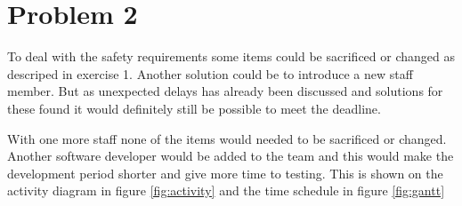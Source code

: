 \chapter{Problem 2}
\label{chp:two}


To deal with the safety requirements some items could be sacrificed or changed as descriped in exercise 1. Another solution could be to introduce a new staff member. But as unexpected delays has already been discussed and solutions for these found it would definitely still be possible to meet the deadline.

With one more staff none of the items would needed to be sacrificed or changed. Another software developer would be added to the team and this would make the development period shorter and give more time to testing. This is shown on the activity diagram in figure \ref{fig:activity} and the time schedule in figure \ref{fig:gantt}





